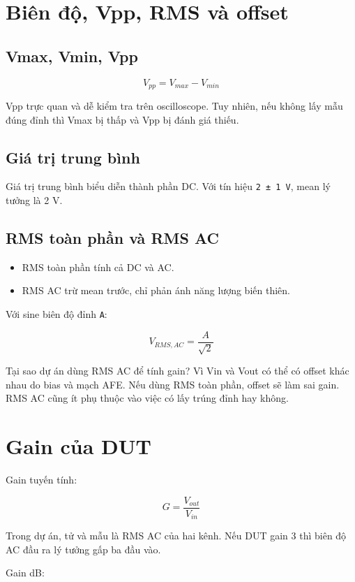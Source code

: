 \documentclass[12pt,a4paper,oneside]{article}
\newcommand{\inlinecode}[1]{\texttt{#1}}
\begin{document}
\section{Biên độ, Vpp, RMS và offset}

\subsection{Vmax, Vmin, Vpp}

\[
V_{pp}=V_{max}-V_{min}
\]

Vpp trực quan và dễ kiểm tra trên oscilloscope. Tuy nhiên, nếu không lấy mẫu đúng đỉnh thì Vmax bị thấp và Vpp bị đánh giá thiếu.

\subsection{Giá trị trung bình}

Giá trị trung bình biểu diễn thành phần DC. Với tín hiệu \inlinecode{2 ± 1 V}, mean lý tưởng là 2 V.

\subsection{RMS toàn phần và RMS AC}

\begin{itemize}
\item RMS toàn phần tính cả DC và AC.
\item RMS AC trừ mean trước, chỉ phản ánh năng lượng biến thiên.
\end{itemize}

Với sine biên độ đỉnh \inlinecode{A}:

\[
V_{RMS,AC}=\frac{A}{\sqrt{2}}
\]

Tại sao dự án dùng RMS AC để tính gain? Vì Vin và Vout có thể có offset khác nhau do bias và mạch AFE. Nếu dùng RMS toàn phần, offset sẽ làm sai gain. RMS AC cũng ít phụ thuộc vào việc có lấy trúng đỉnh hay không.

\section{Gain của DUT}

Gain tuyến tính:

\[
G=\frac{V_{out}}{V_{in}}
\]

Trong dự án, tử và mẫu là RMS AC của hai kênh. Nếu DUT gain 3 thì biên độ AC đầu ra lý tưởng gấp ba đầu vào.

Gain dB:
\end{document}
